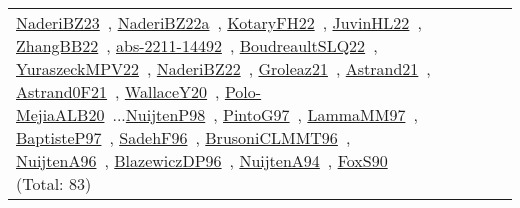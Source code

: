 {\begin{longtable}{p{3cm}r>{\raggedright\arraybackslash}p{6cm}>{\raggedright\arraybackslash}p{6cm}>{\raggedright\arraybackslash}p{8cm}}
\href{../works/NaderiBZ23.pdf}{NaderiBZ23}~\cite{NaderiBZ23}, \href{../works/NaderiBZ22a.pdf}{NaderiBZ22a}~\cite{NaderiBZ22a}, \href{../works/KotaryFH22.pdf}{KotaryFH22}~\cite{KotaryFH22}, \href{../works/JuvinHL22.pdf}{JuvinHL22}~\cite{JuvinHL22}, \href{../works/ZhangBB22.pdf}{ZhangBB22}~\cite{ZhangBB22}, \href{../works/abs-2211-14492.pdf}{abs-2211-14492}~\cite{abs-2211-14492}, \href{../works/BoudreaultSLQ22.pdf}{BoudreaultSLQ22}~\cite{BoudreaultSLQ22}, \href{../works/YuraszeckMPV22.pdf}{YuraszeckMPV22}~\cite{YuraszeckMPV22}, \href{../works/NaderiBZ22.pdf}{NaderiBZ22}~\cite{NaderiBZ22}, \href{../works/Groleaz21.pdf}{Groleaz21}~\cite{Groleaz21}, \href{../works/Astrand21.pdf}{Astrand21}~\cite{Astrand21}, \href{../works/Astrand0F21.pdf}{Astrand0F21}~\cite{Astrand0F21}, \href{../works/WallaceY20.pdf}{WallaceY20}~\cite{WallaceY20}, \href{../works/Polo-MejiaALB20.pdf}{Polo-MejiaALB20}~\cite{Polo-MejiaALB20}...\href{../works/NuijtenP98.pdf}{NuijtenP98}~\cite{NuijtenP98}, \href{../works/PintoG97.pdf}{PintoG97}~\cite{PintoG97}, \href{../works/LammaMM97.pdf}{LammaMM97}~\cite{LammaMM97}, \href{../works/BaptisteP97.pdf}{BaptisteP97}~\cite{BaptisteP97}, \href{../works/SadehF96.pdf}{SadehF96}~\cite{SadehF96}, \href{../works/BrusoniCLMMT96.pdf}{BrusoniCLMMT96}~\cite{BrusoniCLMMT96}, \href{../works/NuijtenA96.pdf}{NuijtenA96}~\cite{NuijtenA96}, \href{../works/BlazewiczDP96.pdf}{BlazewiczDP96}~\cite{BlazewiczDP96}, \href{../works/NuijtenA94.pdf}{NuijtenA94}~\cite{NuijtenA94}, \href{../works/FoxS90.pdf}{FoxS90}~\cite{FoxS90} (Total: 83)\\

\end{longtable}}
